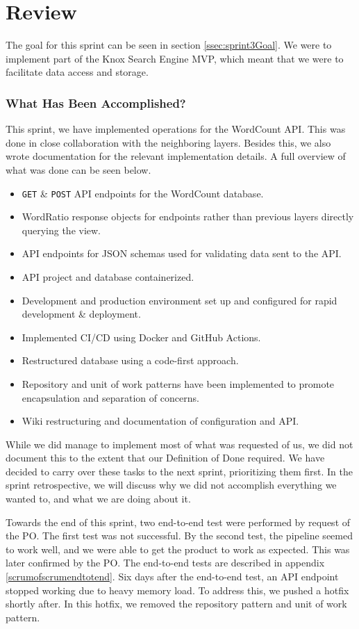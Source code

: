 \section{Review}
The goal for this sprint can be seen in section \ref{ssec:sprint3Goal}. We were to implement part of the Knox Search Engine MVP, which meant that we were to facilitate data access and storage.

\subsubsection{What Has Been Accomplished?}
This sprint, we have implemented operations for the WordCount API. This was done in close collaboration with the neighboring layers. 
Besides this, we also wrote documentation for the relevant implementation details. A full overview of what was done can be seen below.

\begin{itemize}
    \item \texttt{GET} \& \texttt{POST} API endpoints for the WordCount database.
    \item WordRatio response objects for endpoints rather than previous layers directly querying the view.
    \item API endpoints for JSON schemas used for validating data sent to the API.
    \item API project and database containerized.
    \item Development and production environment set up and configured for rapid development \& deployment.
    \item Implemented CI/CD using Docker and GitHub Actions.
    \item Restructured database using a code-first approach.
    \item Repository and unit of work patterns have been implemented to promote encapsulation and separation of concerns.
    \item Wiki restructuring and documentation of configuration and API.
\end{itemize}

While we did manage to implement most of what was requested of us, we did not document this to the extent that our Definition of Done required. 
We have decided to carry over these tasks to the next sprint, prioritizing them first. In the sprint retrospective, we will discuss why we did not accomplish everything we wanted to, and what we are doing about it.

Towards the end of this sprint, two end-to-end test were performed by request of the \knox{} PO. The first test was not successful.  By the second test, the pipeline seemed to work well, and we were able to get the product to work as expected. This was later confirmed by the PO. The end-to-end tests are described in appendix \ref{scrumofscrumendtotend}.
Six days after the end-to-end test, an API endpoint stopped working due to heavy memory load.
To address this, we pushed a hotfix shortly after. In this hotfix, we removed the repository pattern and unit of work pattern.

